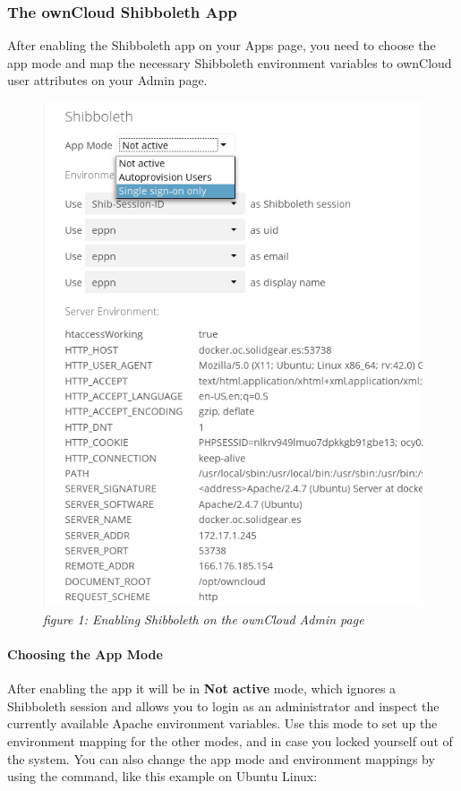 \documentclass[letterpaper,10pt,english]{sphinxmanual}
\begin{document}
\subsubsection{The ownCloud Shibboleth App}
\label{enterprise_user_management/user_auth_shibboleth:the-owncloud-shibboleth-app}
After enabling the Shibboleth app on your Apps page, you need to choose the app
mode and map the necessary Shibboleth environment variables to ownCloud user
attributes on your Admin page.
\begin{figure}[htbp]
\centering
\capstart

\includegraphics{shib-gui5.png}
\caption{\emph{figure 1: Enabling Shibboleth on the ownCloud Admin page}}\end{figure}


\paragraph{Choosing the App Mode}
\label{enterprise_user_management/user_auth_shibboleth:choosing-the-app-mode}
After enabling the app it will be in \textbf{Not active} mode, which ignores a
Shibboleth session and allows you to login as an administrator and inspect the
currently available Apache environment variables. Use this mode to set up the
environment mapping for the other modes, and in case you locked yourself out of
the system. You can also change the app mode and environment mappings by using
the  command, like this example on Ubuntu Linux:
\end{document}
